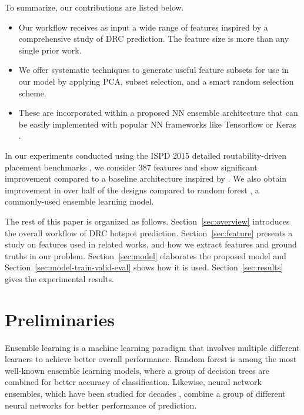 \documentclass[10pt, final, letter, twocolumns]{IEEEtran}
\begin{document}
To summarize, our contributions are listed below.
\begin{itemize}%
\item Our   workflow receives as input a wide range of features inspired by a comprehensive study of DRC  prediction. The feature size is more than any single prior work. 
\item We offer systematic techniques to generate useful feature subsets for use in our model by applying PCA, subset selection, and a smart random selection scheme.
\item These are incorporated within a proposed NN ensemble architecture that can be easily implemented with popular NN frameworks like Tensorflow \cite{tensorflow} or Keras \cite{keras}.
\end{itemize}

In our experiments conducted using the ISPD 2015 detailed routability-driven placement benchmarks \cite{ISPD15benchmark}, we consider 387 features and show significant improvement compared to a baseline architecture inspired by \cite{DAC18}.
We also obtain improvement in over half of the designs compared to random forest \cite{random-forest}, a commonly-used ensemble learning model.

The rest of this paper is organized as follows. Section~\ref{sec:overview} introduces the overall workflow of DRC hotspot prediction. Section~\ref{sec:feature} presents a study on features used in related works, and how we extract features and ground truths in our problem. Section~\ref{sec:model} elaborates the proposed model and Section~\ref{sec:model-train-valid-eval} shows how it is used. Section~\ref{sec:results} gives the experimental results.

%

\section{Preliminaries}
\label{sec:prelim}
Ensemble learning is a machine learning paradigm that involves multiple different learners to achieve better overall performance. Random forest \cite{random-forest} is among the most well-known ensemble learning models, where a group of decision trees are combined for better accuracy of classification. Likewise, neural network ensembles, which have been studied for decades \cite{NNE90, NNE95, NNE96, NNEzhou02}, combine a group of different neural networks for better performance of prediction.
\end{document}
